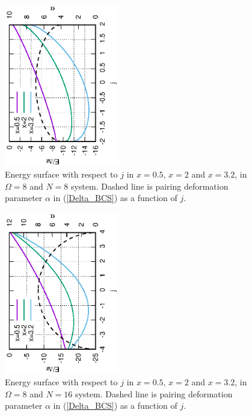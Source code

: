 \documentclass[%
superscriptaddress,
preprint,
showpacs,
nofootinbib,
amsmath,amssymb,
prc,
floatfix ]%
{revtex4-1}
\begin{document}
\begin{figure}[htbp]
 \begin{center}
  \includegraphics[width=50mm,angle=-90]{images/N8p_E.eps}
 \end{center}
 \caption{Energy surface with respect to $j$ in $x=0.5$, $x=2$ and $x=3.2$, in $\Omega=8$ and $N=8$ system.
 Dashed line is pairing deformation parameter $\alpha$ in (\ref{Delta_BCS}) as a function of $j$.}
 \label{fig:p_Delta1}
\end{figure}

\begin{figure}[htbp]
 \begin{center}
  \includegraphics[width=50mm,angle=-90]{images/N16p_E.eps}
 \end{center}
 \caption{Energy surface with respect to $j$ in $x=0.5$, $x=2$ and $x=3.2$, in $\Omega=8$ and $N=16$ system.
 Dashed line is pairing deformation parameter $\alpha$ in (\ref{Delta_BCS}) as a function of $j$.}
 \label{fig:p_Delta2}
\end{figure}
\end{document}
